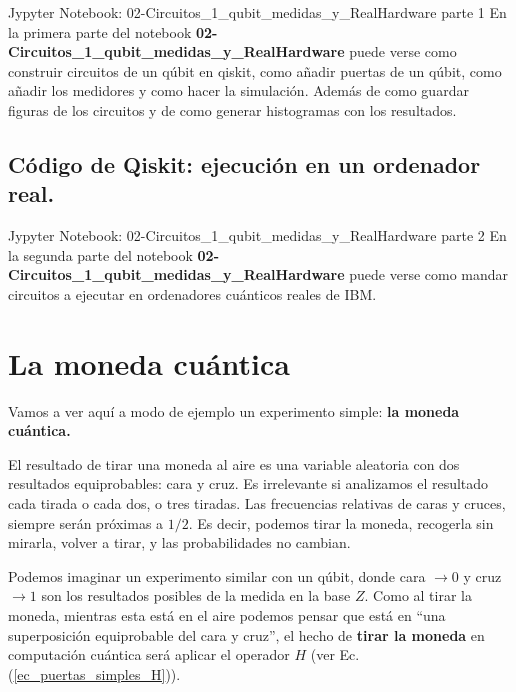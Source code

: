 \documentclass[a4paper,11pt]{book} %
\numberwithin{equation}{chapter}
\begin{document}
	\begin{mybox_orange}{Jypyter Notebook: 02-Circuitos\_1\_qubit\_medidas\_y\_RealHardware parte 1}
	En la primera parte del notebook \textbf{02-Circuitos\_1\_qubit\_medidas\_y\_RealHardware} puede verse como construir circuitos de un qúbit en qiskit, 
	como añadir puertas de un qúbit, como añadir los medidores y como hacer la simulación. Además de como guardar figuras de los
	circuitos y de como generar histogramas con los resultados.
	\end{mybox_orange}
	
		\subsection{Código de Qiskit: ejecución en un ordenador real.}
		
	\begin{mybox_orange}{Jypyter Notebook: 02-Circuitos\_1\_qubit\_medidas\_y\_RealHardware parte 2}
	En la segunda parte del notebook \textbf{02-Circuitos\_1\_qubit\_medidas\_y\_RealHardware} puede verse como mandar circuitos a ejecutar en ordenadores 
	cuánticos reales de IBM.
	\end{mybox_orange}
	
		

    \section{La moneda cuántica}
    
Vamos a ver aquí a modo de ejemplo un experimento simple: \textbf{la moneda cuántica.}

El resultado de tirar una moneda al aire es una variable aleatoria con dos resultados equiprobables:  cara y cruz.  Es irrelevante si analizamos el resultado cada tirada o cada dos, o tres tiradas. Las frecuencias relativas de caras y cruces, siempre serán próximas a $1/2$. Es decir, podemos tirar la moneda, recogerla sin mirarla, volver a tirar, y las probabilidades no cambian.

Podemos imaginar un experimento similar con un qúbit, donde cara $\to 0$ y cruz $\to 1$ son los resultados posibles de la medida en la base $Z$. Como al tirar la moneda, mientras esta está en el aire podemos pensar que está en ``una superposición equiprobable del cara y cruz'', el hecho de \textbf{tirar la moneda} en computación cuántica será aplicar el operador $H$ (ver Ec. (\ref{ec_puertas_simples_H})). 
\end{document}
